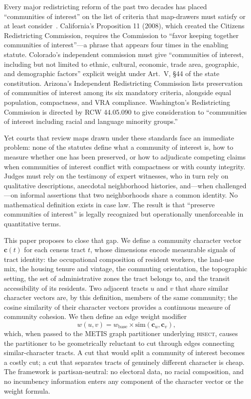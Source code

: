 Every major redistricting reform of the past two decades has placed ``communities of
interest'' on the list of criteria that map-drawers must satisfy or at least
consider~\citep{ncsl2021criteria}.
California's Proposition 11 (2008), which created the Citizens Redistricting Commission,
requires the Commission to ``favor keeping together communities of interest''---a
phrase that appears four times in the enabling statute.
Colorado's independent commission must give ``communities of interest, including but not
limited to ethnic, cultural, economic, trade area, geographic, and demographic factors''
explicit weight under Art.\ V, \S44 of the state constitution.
Arizona's Independent Redistricting Commission lists preservation of communities of
interest among its six mandatory criteria, alongside equal population, compactness,
and VRA compliance.
Washington's Redistricting Commission is directed by RCW 44.05.090 to give consideration
to ``communities of interest including racial and language minority groups.''

Yet courts that review maps drawn under these standards face an immediate problem:
none of the statutes define what a community of interest is, how to measure whether
one has been preserved, or how to adjudicate competing claims when communities of
interest conflict with compactness or with county integrity.
Judges must rely on the testimony of expert witnesses, who in turn rely on qualitative
descriptions, anecdotal neighborhood histories, and---when challenged---on informal
assertions that two neighborhoods share a common identity.
No mathematical definition exists in case law.
The result is that ``preserve communities of interest'' is legally recognized but
operationally unenforceable in quantitative terms.

This paper proposes to close that gap.
We define a community character vector $\mathbf{c}(t)$ for each census tract $t$,
whose dimensions encode measurable signals of tract identity: the occupational composition
of resident workers, the land-use mix, the housing tenure and vintage, the commuting
orientation, the topographic setting, the set of administrative zones the tract belongs
to, and the transit accessibility of its residents.
Two adjacent tracts $u$ and $v$ that share similar character vectors are, by this
definition, members of the same community; the cosine similarity of their character
vectors provides a continuous measure of community cohesion.
We then define an edge weight modifier
\begin{equation}
  w(u,v) = w_{\mathrm{base}} \times \mathrm{sim}(\mathbf{c}_u, \mathbf{c}_v),
  \label{eq:general-weight}
\end{equation}
which, when passed to the METIS graph partitioner underlying \textsc{bisect}, causes
the partitioner to be geometrically reluctant to cut through edges connecting
similar-character tracts.
A cut that would split a community of interest becomes a costly cut; a cut that
separates tracts of genuinely different character is cheap.
The framework is partisan-neutral: no electoral data, no racial composition, and no
incumbency information enters any component of the character vector or the weight
formula.

